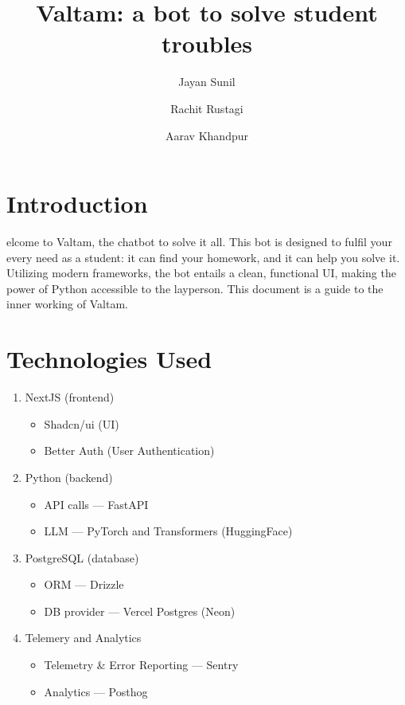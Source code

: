 \documentclass[9pt,a4paper,twocolumn,twoside]{tau-class/tau}
\title{Valtam: a bot to solve student troubles}
\author[a]{Jayan Sunil}
\author[b]{Rachit Rustagi}
\author[c]{Aarav Khandpur}
\affil[a]{IX --- Everest, +91 9910856655}
\affil[b]{IX --- Nilgiris, +91 9211450648}
\affil[c]{IX --- Nilgiris, +91 9211612568}
\begin{document}
\maketitle
\thispagestyle{firststyle}
\tauabstract
\tableofcontents
\linenumbers


\section{Introduction}

elcome to Valtam, the chatbot to solve it all. This bot is designed to fulfil your every need as a student: it can find your homework, and it can help you solve it. Utilizing modern frameworks, the bot entails a clean, functional UI, making the power of Python accessible to the layperson. This document is a guide to the inner working of Valtam.


\section{Technologies Used}
\begin{enumerate}
	\item NextJS (frontend)
	      \begin{itemize}
		      \item Shadcn/ui (UI)
		      \item Better Auth (User Authentication)
	      \end{itemize}
	\item Python (backend)
	      \begin{itemize}
		      \item API calls --- FastAPI
		      \item LLM --- PyTorch and Transformers (HuggingFace)
	      \end{itemize}
	\item PostgreSQL (database)
	      \begin{itemize}
		      \item ORM --- Drizzle
		      \item DB provider --- Vercel Postgres (Neon)
	      \end{itemize}
	\item Telemery and Analytics
	      \begin{itemize}
		      \item Telemetry \& Error Reporting --- Sentry
		      \item Analytics --- Posthog
	      \end{itemize}
\end{enumerate}
\end{document}
